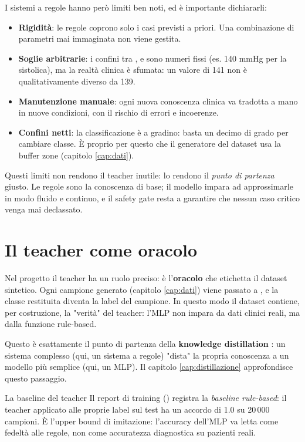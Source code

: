 I sistemi a regole hanno però limiti ben noti, ed è importante dichiararli:

\begin{itemize}
  \item \textbf{Rigidità}: le regole coprono solo i casi previsti a priori.
        Una combinazione di parametri mai immaginata non viene gestita.
  \item \textbf{Soglie arbitrarie}: i confini tra ,
         e  sono numeri fissi (es. 140 mmHg per
        la sistolica), ma la realtà clinica è sfumata: un valore di 141 non
        è qualitativamente diverso da 139.
  \item \textbf{Manutenzione manuale}: ogni nuova conoscenza clinica va
        tradotta a mano in nuove condizioni, con il rischio di errori e
        incoerenze.
  \item \textbf{Confini netti}: la classificazione è a gradino: basta un
        decimo di grado per cambiare classe. È proprio per questo che il
        generatore del dataset usa la buffer zone (capitolo \ref{cap:dati}).
\end{itemize}

Questi limiti non rendono il teacher inutile: lo rendono il \emph{punto di
partenza} giusto. Le regole sono la conoscenza di base; il modello impara ad
approssimarle in modo fluido e continuo, e il safety gate resta a garantire
che nessun caso critico venga mai declassato.

\section{Il teacher come oracolo}\label{sec:teacher-oracolo}

Nel progetto il teacher ha un ruolo preciso: è l'\textbf{oracolo} che
etichetta il dataset sintetico. Ogni campione generato (capitolo
\ref{cap:dati}) viene passato a , e la classe restituita
diventa la label del campione. In questo modo il dataset contiene, per
costruzione, la "verità" del teacher: l'MLP non impara da dati clinici reali,
ma dalla funzione rule-based.

Questo è esattamente il punto di partenza della \textbf{knowledge
distillation} \cite{hinton2015distilling}: un sistema complesso (qui, un
sistema a regole) "dista" la propria conoscenza a un modello più semplice
(qui, un MLP). Il capitolo \ref{cap:distillazione} approfondisce questo
passaggio.

\begin{esempio}{La baseline del teacher}
Il report di training () registra la
\emph{baseline rule-based}: il teacher applicato alle proprie label sul test
ha un accordo di 1.0 su 20\,000 campioni. È l'upper bound di imitazione:
l'accuracy dell'MLP va letta come fedeltà alle regole, non come accuratezza
diagnostica su pazienti reali.
\end{esempio}